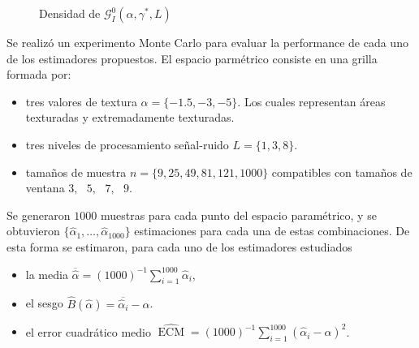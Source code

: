 \begin{figure}[H]
	\centering
	\caption{\label{densidades}\small Densidad de $\mathcal{G}_I^0(\alpha,\gamma^*,L)$}
\end{figure}


Se realizó un experimento Monte Carlo para evaluar la performance de cada uno de los estimadores propuestos. El espacio parmétrico consiste en una grilla formada por:
\begin{itemize}
	\item tres valores de textura $\alpha=\{-1.5,-3,-5\}$. Los cuales representan áreas texturadas y extremadamente texturadas.
	\item tres niveles de procesamiento señal-ruido $L=\{1,3,8\}$.
	\item tamaños de muestra $n=\{9,25,49,81,121,1000\}$ compatibles con tamaños de ventana $3,\text{ }5,\text{ }7,\text{ }9$.
\end{itemize}

Se generaron $1000$ muestras para cada punto del espacio paramétrico, y se obtuvieron $\{\widehat{\alpha}_1, \dots, \widehat{\alpha}_{1000}\}$ estimaciones para cada una de estas combinaciones. De esta forma se estimaron, para cada uno de los estimadores estudiados
\begin{itemize}
	\label{ExperimentoMontecarlo}
	\item la media $\overline{\widehat{\alpha}}=(1000)^{-1}{\sum_{i=1}^{1000}{\widehat{\alpha}_i}}$,
	\item el sesgo  $\widehat{B}(\widehat\alpha) = \overline{\widehat\alpha_i}- \alpha$.
	 \item el error cuadrático medio $\widehat{\operatorname{ECM}}=({1000})^{-1}{\sum_{i=1}^{1000}{(\widehat{\alpha}_i-\alpha)^2}}$.
\end{itemize}
  
